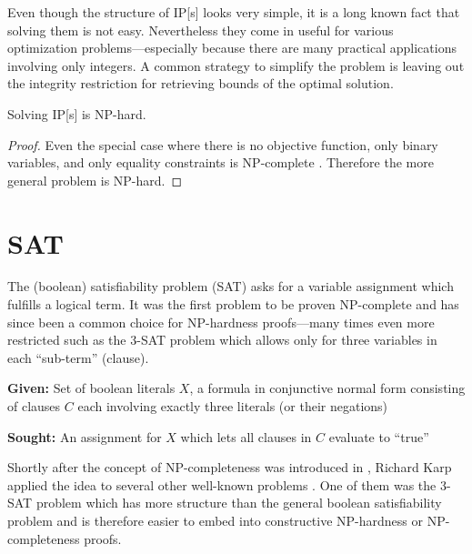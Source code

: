 Even though the structure of \gls{IP}[s] looks very simple, it is a
long known fact that solving them is not easy. Nevertheless they come
in useful for various optimization problems---especially because there
are many practical applications involving only integers. A common
strategy to simplify the problem is leaving out the integrity
restriction for retrieving bounds of the optimal solution.

\begin{theorem}
  Solving \gls{IP}[s] is NP-hard.
  \begin{proof}
  Even the special case where there is no objective function, only
  binary variables, and only equality constraints is NP-complete
  \cite{karp_np_complete}. 
  Therefore the more general problem is NP-hard.
  \end{proof}
\end{theorem}

\section{SAT}
The (boolean) satisfiability problem (SAT) asks for a variable
assignment which fulfills a logical term. It was the first problem to
be proven NP-complete \cite{np_complete} and has since been a common
choice for NP-hardness proofs---many times even more restricted such
as the 3-SAT problem which allows only for three variables in each
``sub-term'' (clause).

\begin{problem}[3-SAT]
  \label{prob:3SAT}\hfill
  \begin{labeling}{\hspace{4em}}
    \item[\textbf{Given:}]
      Set of boolean literals \(X\), a formula in conjunctive 
      normal form consisting of clauses \(C\) each involving 
      exactly three literals (or their negations)
    \item[\textbf{Sought:}]
      An assignment for \(X\) which lets all clauses in \(C\) evaluate
      to ``true''
  \end{labeling}
\end{problem}

Shortly after the concept of NP-completeness was introduced in
\cite{np_complete}, Richard Karp applied the idea to several other
well-known problems \cite{karp_np_complete}. One of them was the
3-SAT problem which has more structure than the general boolean
satisfiability problem and is therefore easier to embed into
constructive NP-hardness or NP-completeness proofs.

